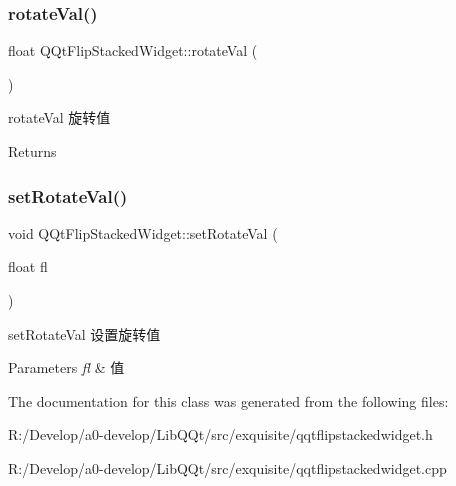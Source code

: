 \subsubsection{\texorpdfstring{rotate\+Val()}{rotateVal()}}
{\footnotesize\ttfamily float Q\+Qt\+Flip\+Stacked\+Widget\+::rotate\+Val (\begin{DoxyParamCaption}{ }\end{DoxyParamCaption})}



rotate\+Val 旋转值 

\begin{DoxyReturn}{Returns}

\end{DoxyReturn}
\mbox{\label{class_q_qt_flip_stacked_widget_a5bcfb398a82a9fdab8aa0ec56eb2f883}} 
\subsubsection{\texorpdfstring{set\+Rotate\+Val()}{setRotateVal()}}
{\footnotesize\ttfamily void Q\+Qt\+Flip\+Stacked\+Widget\+::set\+Rotate\+Val (\begin{DoxyParamCaption}\item[{float}]{fl }\end{DoxyParamCaption})}



set\+Rotate\+Val 设置旋转值 


\begin{DoxyParams}{Parameters}
{\em fl} & 值 \\
\hline
\end{DoxyParams}


The documentation for this class was generated from the following files\+:\begin{DoxyCompactItemize}
\item 
R\+:/\+Develop/a0-\/develop/\+Lib\+Q\+Qt/src/exquisite/qqtflipstackedwidget.\+h\item 
R\+:/\+Develop/a0-\/develop/\+Lib\+Q\+Qt/src/exquisite/qqtflipstackedwidget.\+cpp\end{DoxyCompactItemize}
